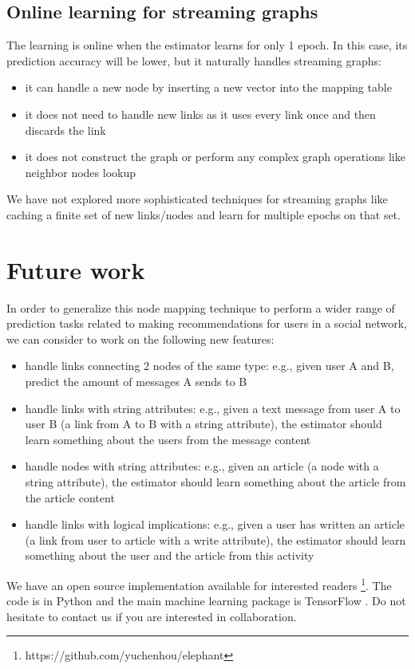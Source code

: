 \documentclass{article}
\begin{document}
\subsection{Online learning for streaming graphs}
The learning is online when the estimator learns for only 1 epoch. In 
this case, its prediction accuracy will be lower, but it naturally handles 
streaming graphs:
\begin{itemize}
	\item it can handle a new node by inserting a new vector into the mapping 
	table
	\item it does not need to handle new links as it uses every link once and 
	then discards the link
	\item it does not construct the graph or perform any complex graph 
	operations like neighbor nodes lookup
\end{itemize}
We have not explored more sophisticated techniques for streaming graphs like 
caching a finite set of new links/nodes and learn for multiple epochs on that 
set.

\section{Future work}
In order to generalize this node mapping technique to perform a wider range of 
prediction tasks related to making recommendations for users in a social 
network, we can consider to work on the following new features:
\begin{itemize}
	\item handle links connecting 2 nodes of the same type: e.g., given user A 
	and B, predict the amount of messages A sends to B
	\item handle links with string attributes: e.g., given a text message from 
	user A to user B (a link from A to B with a string attribute), the 
	estimator should learn something about the users from the message content
	\item handle nodes with string attributes: e.g., given an article (a node 
	with a string attribute), the estimator should learn something about the 
	article from the article content
	\item handle links with logical implications: e.g., given a user has 
	written an article (a link from user to article with a write attribute), 
	the estimator should learn something about the user and the article from 
	this activity
\end{itemize}
We have an open source implementation available for interested readers  
\footnote{https://github.com/yuchenhou/elephant}.
The code is in Python and the main machine learning package is TensorFlow 
\cite{abadi2016tensorflow}.
Do not hesitate to contact us if you are interested in collaboration.
\end{document}

